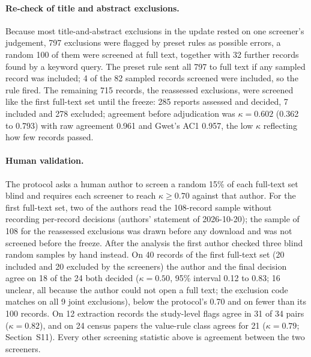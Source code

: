 \documentclass[acmsmall,screen]{acmart}
\begin{document}
\paragraph{Re-check of title and abstract exclusions.}
Because most title-and-abstract exclusions in the update rested on one screener's judgement, 797 exclusions were flagged by preset rules as possible errors, a random 100 of them were screened at full text, together with 32 further records found by a keyword query. The preset rule sent all 797 to full text if any sampled record was included; 4 of the 82 sampled records screened were included, so the rule fired. %
The remaining 715 records, the reassessed exclusions, were screened like the first full-text set until the freeze: 285 reports assessed and decided, 7 included and 278 excluded; agreement before adjudication was $\kappa=0.602$ (0.362 to 0.793) with raw agreement 0.961 and Gwet's AC1 0.957, the low $\kappa$ reflecting how few records passed. %

\paragraph{Human validation.}
The protocol asks a human author to screen a random 15\% of each full-text set blind and requires each screener to reach $\kappa\ge0.70$ against that author. For the first full-text set, two of the authors read the 108-record sample without recording per-record decisions (authors' statement of 2026-10-20); the sample of 108 for the reassessed exclusions was drawn before any download and was not screened before the freeze. After the analysis the first author checked three blind random samples by hand instead. On 40 records of the first full-text set (20 included and 20 excluded by the screeners) the author and the final decision agree on 18 of the 24 both decided ($\kappa=0.50$, 95\% interval 0.12 to 0.83; 16 unclear, all because the author could not open a full text; the exclusion code matches on all 9 joint exclusions), below the protocol's 0.70 and on fewer than its 100 records. On 12 extraction records the study-level flags agree in 31 of 34 pairs ($\kappa=0.82$), and on 24 census papers the value-rule class agrees for 21 ($\kappa=0.79$; Section~S11). Every other screening statistic above is agreement between the two screeners. %
\end{document}
